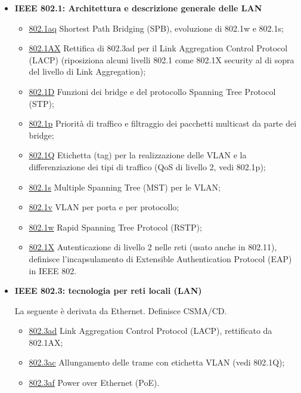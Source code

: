 \begin{itemize}

\item{\textbf{IEEE 802.1: Architettura e descrizione generale delle LAN}}

\begin{itemize}

\item{\underline{802.1aq}} Shortest Path Bridging (SPB), evoluzione di 802.1w e 802.1s;
\item{\underline{802.1AX}} Rettifica di 802.3ad per il Link Aggregation Control Protocol (LACP) (riposiziona alcuni livelli 802.1 come 802.1X security al di sopra del livello di Link Aggregation);
\item{\underline{802.1D}} Funzioni dei bridge e del protocollo Spanning Tree Protocol (STP);
\item{\underline{802.1p}} Priorità di traffico e filtraggio dei pacchetti multicast da parte dei bridge;
\item{\underline{802.1Q}} Etichetta (tag) per la realizzazione delle VLAN e la differenziazione dei tipi di traffico (QoS di livello 2, vedi 802.1p);
\item{\underline{802.1s}} Multiple Spanning Tree (MST) per le VLAN;
\item{\underline{802.1v}} VLAN per porta e per protocollo;
\item{\underline{802.1w}} Rapid Spanning Tree Protocol (RSTP);
\item{\underline{802.1X}} Autenticazione di livello 2 nelle reti (usato anche in 802.11), definisce l’incapsulamento di Extensible Authentication Protocol (EAP) in IEEE 802.

\end{itemize}

\item{\textbf{IEEE 802.3: tecnologia per reti locali (LAN)}}

La seguente è derivata da Ethernet. Definisce CSMA/CD. 

\begin{itemize}

\item{\underline{802.3ad}} Link Aggregation Control Protocol (LACP), rettificato da 802.1AX;
\item{\underline{802.3ac}} Allungamento delle trame con etichetta VLAN (vedi 802.1Q);\item{\underline{802.3af}} Power over Ethernet (PoE).

\end{itemize}


\end{itemize}
